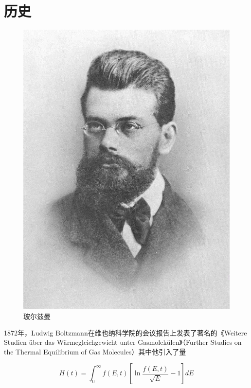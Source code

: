 

\section{历史}

\begin{figure}[H]
	\centering
	\includegraphics[width=\linewidth/2]{pic/bolzman.jpg}
	\caption{玻尔兹曼}
	\label{fig:results}
\end{figure}


1872年，Ludwig Boltzmann在维也纳科学院的会议报告上发表了著名的《Weitere Studien über das Wärmegleichgewicht unter Gasmolekülen》（Further Studies on the Thermal Equilibrium of Gas Molecules）其中他引入了量

\begin{equation}
  H(t)=\int_0^\infty f(E,t)[\ln \frac{f(E,t)}{\sqrt{E}}-1]   dE
\end{equation}

